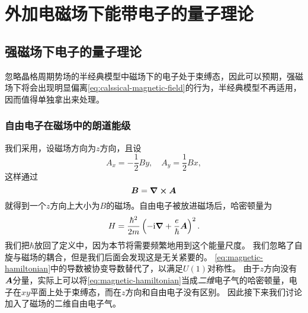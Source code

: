\section{外加电磁场下能带电子的量子理论}

\subsection{强磁场下电子的量子理论}\label{sec:quantum-magnetic-field}

忽略晶格周期势场的半经典模型中磁场下的电子处于束缚态，因此可以预期，强磁场下将会出现明显偏离\eqref{eq:calssical-magnetic-field}的行为，半经典模型不再适用，因而值得单独拿出来处理。

\subsubsection{自由电子在磁场中的朗道能级}

我们采用，设磁场方向为$z$方向，且设
\begin{equation}
    A_x = - \frac{1}{2} B y, \quad A_y = \frac{1}{2} B x,
\end{equation}
这样通过
\[
    \vb*{B} = \curl{\vb*{A}}
\]
就得到一个$z$方向上大小为$B$的磁场。自由电子被放进磁场后，哈密顿量为
\begin{equation}
    {H} = \frac{\hbar^2}{2m} \left( - \mathrm{i} \grad + \frac{e}{\hbar} \vb*{A} \right)^2.
    \label{eq:magnetic-hamiltonian}
\end{equation}
我们把$\hbar$放回了定义中，因为本节将需要频繁地用到这个能量尺度。
我们忽略了自旋与磁场的耦合，但是我们后面会发现这是无关紧要的。
\eqref{eq:magnetic-hamiltonian}中的导数被协变导数替代了，以满足$U(1)$对称性。
由于$z$方向没有$\vb*{A}$分量，实际上可以将\eqref{eq:magnetic-hamiltonian}当成\emph{二维}电子气的哈密顿量，电子在$xy$平面上处于束缚态，而在$z$方向和自由电子没有区别。
因此接下来我们讨论加入了磁场的二维自由电子气。

